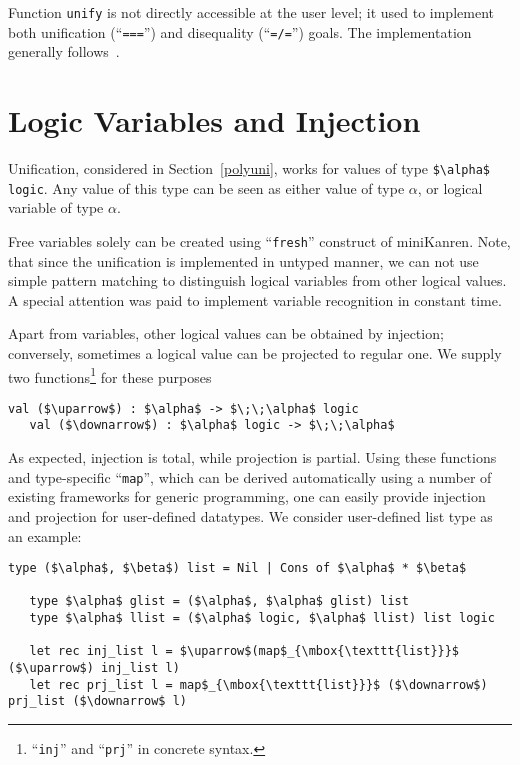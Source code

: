 \documentclass[10pt, oneside, nocopyrightspace]{sigplanconf}
\begin{document}
Function \lstinline{unify} is not directly accessible at the user level; it used
to implement both unification (``\lstinline{===}'') and disequality (``\lstinline{=/=}'') 
goals. The implementation generally follows~\cite{CKanren}.

\section{Logic Variables and Injection}
\label{logics}

Unification, considered in Section~\ref{polyuni}, works for values of type \lstinline[mathescape=true]{$\alpha$ logic}. 
Any value of this type can be seen as either value of type $\alpha$, or logical variable of type $\alpha$. 

\begin{comment}
The type 
itself in made abstract, but its values can be uncovered after refinement (see Section~\ref{refinement}).
\end{comment}

Free variables solely can be created using ``\lstinline{fresh}'' construct of miniKanren. Note, that 
since the unification is implemented in untyped manner, we can not use simple pattern matching to
distinguish logical variables from other logical values. A special attention was paid to implement
variable recognition in constant time.

Apart from variables, other logical values can be obtained by injection; conversely, sometimes
a logical value can be projected to regular one. We supply two functions\footnote{``\lstinline{inj}'' and ``\lstinline{prj}'' in concrete syntax.}
for these purposes

\begin{lstlisting}[mathescape=true]
   val ($\uparrow$) : $\alpha$ -> $\;\;\alpha$ logic
   val ($\downarrow$) : $\alpha$ logic -> $\;\;\alpha$
\end{lstlisting}

As expected, injection is total, while projection is partial. Using these functions and type-specific
``\lstinline{map}'', which can be derived automatically using a number of existing frameworks for
generic programming, one can easily provide injection and projection for user-defined datatypes. We
consider user-defined list type as an example:

\begin{lstlisting}[mathescape=true]
   type ($\alpha$, $\beta$) list = Nil | Cons of $\alpha$ * $\beta$
   
   type $\alpha$ glist = ($\alpha$, $\alpha$ glist) list
   type $\alpha$ llist = ($\alpha$ logic, $\alpha$ llist) list logic

   let rec inj_list l = $\uparrow$(map$_{\mbox{\texttt{list}}}$ ($\uparrow$) inj_list l) 
   let rec prj_list l = map$_{\mbox{\texttt{list}}}$ ($\downarrow$) prj_list ($\downarrow$ l)
\end{lstlisting}
\end{document}
